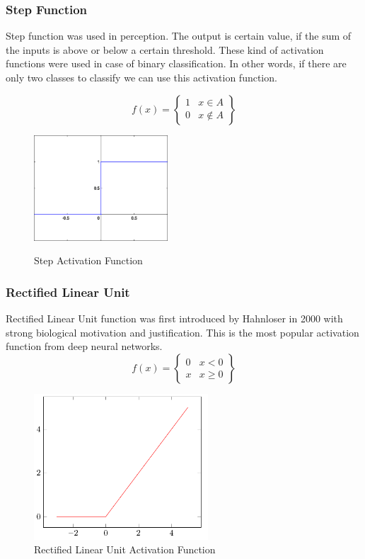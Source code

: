 \documentclass[12pt, a4paper]{report}
\begin{document}
\subsubsection{Step Function}\label{sec:step}
Step function was used in perception. The output is certain value, if the sum of the inputs is above or below a certain threshold. These kind of activation functions were used in case of binary classification. In other words, if there are only two classes to classify we can use this activation function.\\ \par
 \begin{equation}\label{eq:step}
f(x) = \begin{Bmatrix}
1 & x \in A \\ 
0 & x \notin A 
\end{Bmatrix}
\end{equation}

\begin{figure}[h]
\centering	
\includegraphics[width=5cm]{step.png}\\
\caption{Step Activation Function}
\label{fig:step}
\end{figure} 	

\subsubsection{Rectified Linear Unit}\label{sec:ReLU}
Rectified Linear Unit function was first introduced by Hahnloser in 2000 \cite{ReLU} with strong biological motivation and justification. This is the most popular activation function from deep neural networks.\\ 
\begin{equation}\label{eq:ReLU}
f(x) = \begin{Bmatrix}
0 & x < 0 \\ 
x & x \geq 0 
\end{Bmatrix}
\end{equation}
\begin{figure}[h]
\centering
\includegraphics[width=6.5cm]{relu.png}
\caption{Rectified Linear Unit Activation Function}
\label{fig:ReLU}
\end{figure} 
\end{document}
